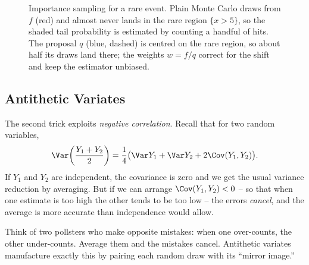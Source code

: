 \begin{figure}[H]
\centering
{}
\caption{Importance sampling for a rare event. Plain Monte Carlo draws from $f$
(red) and almost never lands in the rare region $\{x>5\}$, so the shaded tail
probability is estimated by counting a handful of hits. The proposal $q$ (blue,
dashed) is centred on the rare region, so about half its draws land there; the
weights $w=f/q$ correct for the shift and keep the estimator unbiased.}
\label{ch35:fig-importance}
\end{figure}

\subsection{Antithetic Variates}
\label{ch35:antithetic}

The second trick exploits \emph{negative correlation}. Recall that for two random
variables,
\[
  \Var\!\left(\frac{Y_1 + Y_2}{2}\right)
  = \frac14\bigl(\Var Y_1 + \Var Y_2 + 2\Cov(Y_1,Y_2)\bigr).
\]
If $Y_1$ and $Y_2$ are independent, the covariance is zero and we get the usual
variance reduction by averaging. But if we can arrange $\Cov(Y_1,Y_2) < 0$ -- so
that when one estimate is too high the other tends to be too low -- the errors
\emph{cancel}, and the average is more accurate than independence would allow.

\begin{intuitionbox}
Think of two pollsters who make opposite mistakes: when one over-counts, the
other under-counts. Average them and the mistakes cancel. Antithetic variates
manufacture exactly this by pairing each random draw with its ``mirror image.''
\end{intuitionbox}

